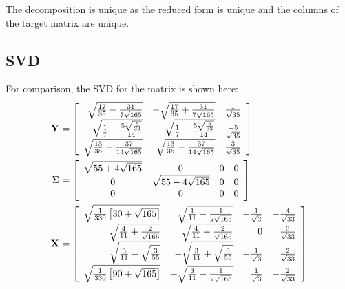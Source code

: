 The decomposition is unique as the reduced form is unique and the columns of the target matrix are unique.

\subsection{SVD}
For comparison, the SVD for the matrix is shown here:
\begin{equation}
  \begin{split}
    \textbf{Y}^{\mathrm{}}   & =
\left[
\begin{array}{rrr}
 \sqrt{\frac{17}{35}-\frac{31}{7 \sqrt{165}}} & -\sqrt{\frac{17}{35}+\frac{31}{7 \sqrt{165}}} & \frac{1}{\sqrt{35}} \\
 \sqrt{\frac{1}{7}+\frac{5 \sqrt{\frac{5}{33}}}{14}} & \sqrt{\frac{1}{7}-\frac{5 \sqrt{\frac{5}{33}}}{14}} & \frac{-5}{\sqrt{35}} \\
 \sqrt{\frac{13}{35}+\frac{37}{14 \sqrt{165}}} & \sqrt{\frac{13}{35}-\frac{37}{14 \sqrt{165}}} & \frac{3}{\sqrt{35}}
\end{array}
\right] \\
    \Sigma^{\mathrm{}} & =
\left[
\begin{array}{ccrr}
 \sqrt{55+4 \sqrt{165}} & 0 & 0 & 0 \\
 0 & \sqrt{55-4 \sqrt{165}} & 0 & 0 \\
 0 & 0 & 0 & 0
\end{array}
\right] \\
    \textbf{X}^{\mathrm{}}   & =
\left[
\begin{array}{rrrr}
 \sqrt{\frac{1}{330} \left[30+\sqrt{165}\right]} & \sqrt{\frac{1}{11}-\frac{1}{2 \sqrt{165}}} & -\frac{1}{\sqrt{3}} & -\frac{4}{\sqrt{33}} \\
 \sqrt{\frac{4}{11}+\frac{2}{\sqrt{165}}} & \sqrt{\frac{4}{11}-\frac{2}{\sqrt{165}}} & 0 & \frac{3}{\sqrt{33}} \\
 \sqrt{\frac{3}{11}-\sqrt{\frac{3}{55}}} & -\sqrt{\frac{3}{11}+\sqrt{\frac{3}{55}}} & -\frac{1}{\sqrt{3}} & \frac{2}{\sqrt{33}} \\
 \sqrt{\frac{1}{330} \left[90+\sqrt{165}\right]} & -\sqrt{\frac{3}{11}-\frac{1}{2 \sqrt{165}}} & \frac{1}{\sqrt{3}} & -\frac{2}{\sqrt{33}}
\end{array}
\right] 
  \end{split}
\end{equation}


